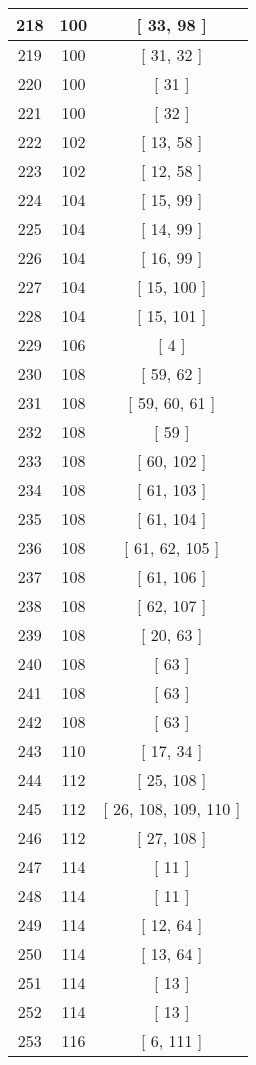 \begin{center}
\begin{longtable}[H]{|| c c c ||}
\hline
218 & 100 & [ 33, 98 ] \\ 
\hline
219 & 100 & [ 31, 32 ] \\ 
\hline
220 & 100 & [ 31 ] \\ 
\hline
221 & 100 & [ 32 ] \\ 
\hline
222 & 102 & [ 13, 58 ] \\ 
\hline
223 & 102 & [ 12, 58 ] \\ 
\hline
224 & 104 & [ 15, 99 ] \\ 
\hline
225 & 104 & [ 14, 99 ] \\ 
\hline
226 & 104 & [ 16, 99 ] \\ 
\hline
227 & 104 & [ 15, 100 ] \\ 
\hline
228 & 104 & [ 15, 101 ] \\ 
\hline
229 & 106 & [ 4 ] \\ 
\hline
230 & 108 & [ 59, 62 ] \\ 
\hline
231 & 108 & [ 59, 60, 61 ] \\ 
\hline
232 & 108 & [ 59 ] \\ 
\hline
233 & 108 & [ 60, 102 ] \\ 
\hline
234 & 108 & [ 61, 103 ] \\ 
\hline
235 & 108 & [ 61, 104 ] \\ 
\hline
236 & 108 & [ 61, 62, 105 ] \\ 
\hline
237 & 108 & [ 61, 106 ] \\ 
\hline
238 & 108 & [ 62, 107 ] \\ 
\hline
239 & 108 & [ 20, 63 ] \\ 
\hline
240 & 108 & [ 63 ] \\ 
\hline
241 & 108 & [ 63 ] \\ 
\hline
242 & 108 & [ 63 ] \\ 
\hline
243 & 110 & [ 17, 34 ] \\ 
\hline
244 & 112 & [ 25, 108 ] \\ 
\hline
245 & 112 & [ 26, 108, 109, 110 ] \\ 
\hline
246 & 112 & [ 27, 108 ] \\ 
\hline
247 & 114 & [ 11 ] \\ 
\hline
248 & 114 & [ 11 ] \\ 
\hline
249 & 114 & [ 12, 64 ] \\ 
\hline
250 & 114 & [ 13, 64 ] \\ 
\hline
251 & 114 & [ 13 ] \\ 
\hline
252 & 114 & [ 13 ] \\ 
\hline
253 & 116 & [ 6, 111 ] \\ 

\end{longtable}
\end{center}
